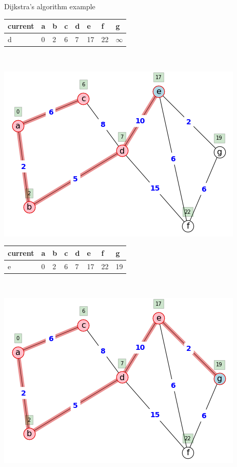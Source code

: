 \begin{example}{Dijkstra's algorithm example}{}
\begin{minipage}{0.5\textwidth}
\end{minipage}
\begin{minipage}{0.5\textwidth}
          \begin{tabular}{|l|l|l|l|l|l|l|l|}
    \hline
        current & a & b & c & d & e & f & g \\ \hline
        d & 0 & 2 & 6 & 7 & 17 & 22 & $\infty$ \\ \hline
    \end{tabular}
     \end{minipage}\\
\begin{minipage}{0.5\textwidth}
\includegraphics[scale = 0.5]{graph-theory-graphics/dijkstra5.png}
\end{minipage}
\begin{minipage}{0.5\textwidth}
         \begin{tabular}{|l|l|l|l|l|l|l|l|}
    \hline
        current & a & b & c & d & e & f & g \\ \hline
        e & 0 & 2 & 6 & 7 & 17 & 22 & 19 \\ \hline
    \end{tabular}
     \end{minipage}\\
\begin{minipage}{0.5\textwidth}
\includegraphics[scale = 0.5]{graph-theory-graphics/dijkstra6.png}

\end{minipage}
\end{example}
